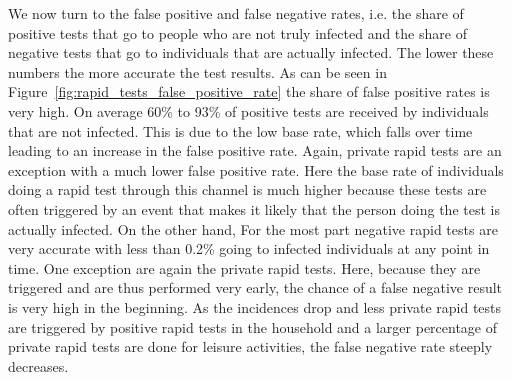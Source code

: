 We now turn to the false positive and false negative rates, i.e. the share of positive
tests that go to people who are not truly infected and the share of negative tests that
go to individuals that are actually infected. The lower these numbers the more accurate
the test results. As can be seen in Figure~\ref{fig:rapid_tests_false_positive_rate} the
share of false positive rates is very high. On average 60\% to 93\% of positive tests are
received by individuals that are not infected. This is due to the low base rate, which
falls over time leading to an increase in the false positive rate. Again, private rapid
tests are an exception with a much lower false positive rate. Here the base rate of
individuals doing a rapid test through this channel is much higher because these tests
are often triggered by an event that makes it likely that the person doing the test is
actually infected. On the other hand, For the most part negative rapid tests are very
accurate with less than 0.2\% going to infected individuals at any point in time. One
exception are again the private rapid tests. Here, because they are triggered and are
thus performed very early, the chance of a false negative result is very high in the
beginning. As the incidences drop and less private rapid tests are triggered by positive
rapid tests in the household and a larger percentage of private rapid tests are done for
leisure activities, the false negative rate steeply decreases.

